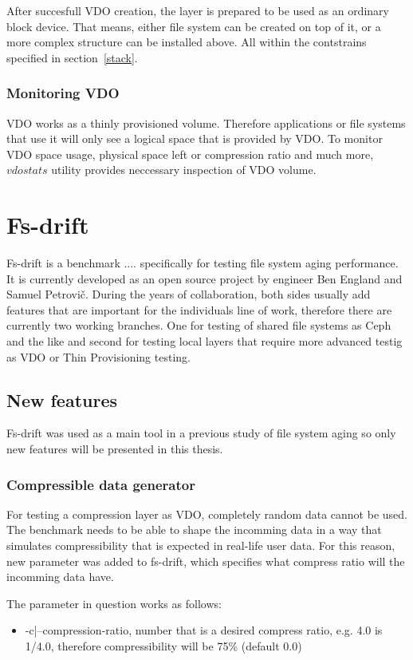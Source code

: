\documentclass[
  color, %
  table, %
  lof,   %
  lot,   %
]{fithesis3}
\begin{document}
After succesfull VDO creation, the layer is prepared to be used as an ordinary block device. That means, either file system can be created on top of it, or a more complex structure can be installed above. All within the contstrains specified in section~\ref{stack}.

\subsection{Monitoring VDO}
VDO works as a thinly provisioned volume. Therefore applications or file systems that use it will only see a logical space that is provided by VDO. To monitor VDO space usage, physical space left or compression ratio and much more, $vdostats$ utility provides neccessary inspection of VDO volume.

\chapter{Fs-drift}
Fs-drift is a benchmark .... specifically for testing file system aging performance. It is currently developed as an open source project by engineer Ben England and Samuel Petrovič. During the years of collaboration, both sides usually add features that are important for the individuals line of work, therefore there are currently two working branches. One for testing of shared file systems as Ceph and the like and second for testing local layers that require more advanced testig as VDO or Thin Provisioning testing. 

\section{New features}
Fs-drift was used as a main tool in a previous study of file system aging so only new features will be presented in this thesis.

\subsection{Compressible data generator}
For testing a compression layer as VDO, completely random data cannot be used. The benchmark needs to be able to shape the incomming data in a way that simulates compressibility that is expected in real-life user data. For this reason, new parameter was added to fs-drift, which specifies what compress ratio will the incomming data have.

The parameter in question works as follows:
\begin{itemize}
    \item -c|--compression-ratio, number that is a desired compress ratio, e.g. 4.0 is 1/4.0, therefore compressibility will be 75\% (default 0.0)
\end{itemize}
\end{document}
